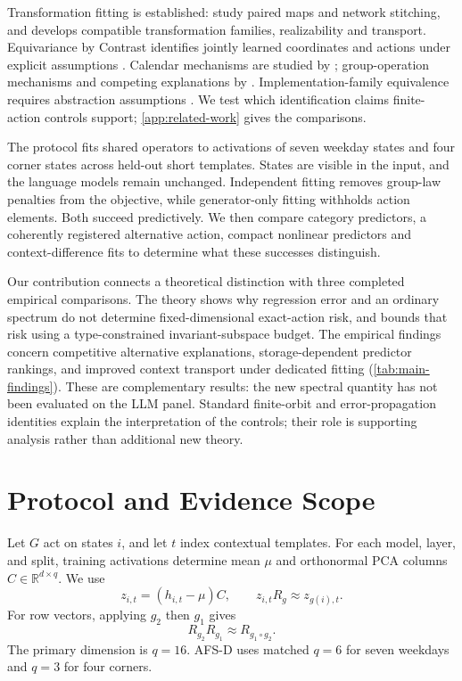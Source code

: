 \documentclass{article}
\newcommand{\R}{\mathbb{R}}
\begin{document}
Transformation fitting is established: \citet{lenc2015understanding} study paired maps and network stitching, and \citet{sun2026transformationlaws} develops compatible transformation families, realizability and transport. Equivariance by Contrast identifies jointly learned coordinates and actions under explicit assumptions \citep{schmidt2025equivariance}. Calendar mechanisms are studied by \citet{engels2025notall}; group-operation mechanisms and competing explanations by \citet{nanda2023progress,chughtai2023toy,wu2025unified}. Implementation-family equivalence requires abstraction assumptions \citep{sun2026tracking}. We test which identification claims finite-action controls support; \cref{app:related-work} gives the comparisons.

The protocol fits shared operators to activations of seven weekday states and four corner states across held-out short templates. States are visible in the input, and the language models remain unchanged. Independent fitting removes group-law penalties from the objective, while generator-only fitting withholds action elements. Both succeed predictively. We then compare category predictors, a coherently registered alternative action, compact nonlinear predictors and context-difference fits to determine what these successes distinguish.



Our contribution connects a theoretical distinction with three completed empirical comparisons. The theory shows why regression error and an ordinary spectrum do not determine fixed-dimensional exact-action risk, and bounds that risk using a type-constrained invariant-subspace budget. The empirical findings concern competitive alternative explanations, storage-dependent predictor rankings, and improved context transport under dedicated fitting (\cref{tab:main-findings}). These are complementary results: the new spectral quantity has not been evaluated on the LLM panel. Standard finite-orbit and error-propagation identities explain the interpretation of the controls; their role is supporting analysis rather than additional new theory.

\section{Protocol and Evidence Scope}
\label{sec:setup}
Let $G$ act on states $i$, and let $t$ index contextual templates. For each model, layer, and split, training activations determine mean $\mu$ and orthonormal PCA columns $C\in\R^{d\times q}$. We use
\begin{equation}
 z_{i,t}=(h_{i,t}-\mu)C,\qquad z_{i,t}R_g\approx z_{g(i),t}.
\end{equation}
For row vectors, applying $g_2$ then $g_1$ gives
\begin{equation}
 R_{g_2}R_{g_1}\approx R_{g_1\circ g_2}.
 \label{eq:convention}
\end{equation}
The primary dimension is $q=16$. AFS-D uses matched $q=6$ for seven weekdays and $q=3$ for four corners.
\end{document}
